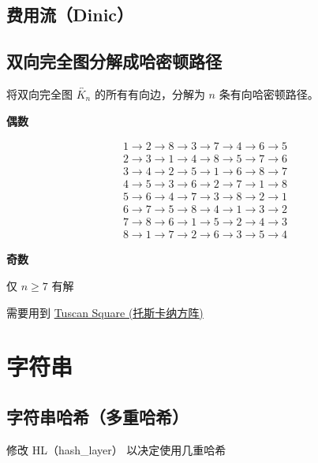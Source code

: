 \documentclass[12pt]{article}
\theoremstyle{definition}
\theoremstyle{remark}
\begin{document}
\newpage

\subsection{费用流（Dinic）}



\newpage

\subsection{双向完全图分解成哈密顿路径}

将双向完全图 $\overleftrightarrow{K_n}$ 的所有有向边，分解为 $n$ 条有向哈密顿路径。

\textbf{偶数}

$$
\begin{gathered}
	1 \to 2 \to 8 \to 3 \to 7 \to 4 \to 6 \to 5 \\
	2 \to 3 \to 1 \to 4 \to 8 \to 5 \to 7 \to 6 \\
	3 \to 4 \to 2 \to 5 \to 1 \to 6 \to 8 \to 7 \\
	4 \to 5 \to 3 \to 6 \to 2 \to 7 \to 1 \to 8 \\
	5 \to 6 \to 4 \to 7 \to 3 \to 8 \to 2 \to 1 \\
	6 \to 7 \to 5 \to 8 \to 4 \to 1 \to 3 \to 2 \\
	7 \to 8 \to 6 \to 1 \to 5 \to 2 \to 4 \to 3 \\
	8 \to 1 \to 7 \to 2 \to 6 \to 3 \to 5 \to 4
\end{gathered}
$$

\textbf{奇数}

仅 $n \ge 7$ 有解

需要用到 \href{https://github.com/Anjiang-Wei/TuscanSquare/blob/main/Tuscan.java}{Tuscan Square (托斯卡纳方阵)}



\newpage

{\centering\section{字符串}}

\subsection{字符串哈希（多重哈希）}

修改 HL（hash\_{}layer） 以决定使用几重哈希
\end{document}

